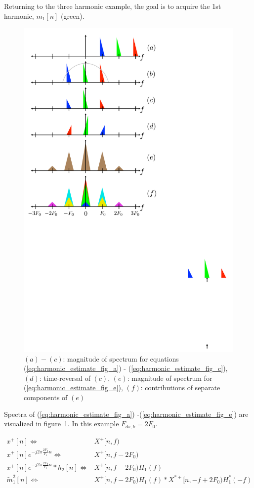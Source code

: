 \documentclass [11pt, proquest,oneside] {ganter_thesis}[2015/03/03]
\begin{document}
Returning to the three harmonic example, the goal is to acquire the 1st harmonic, $m_1[n]$ (green).

\begin{figure}[!ht]
  \centering
    \includegraphics[width=.62\textwidth]{harmonic_envelope_estimate} 
        \caption{$(a)-(c)$: magnitude of spectrum for equations (\ref{eq:harmonic_estimate_fig_a}) - (\ref{eq:harmonic_estimate_fig_c}), $(d)$: time-reversal of $(c)$, $(e)$: magnitude of spectrum for (\ref{eq:harmonic_estimate_fig_e}), $(f)$: contributions of separate components of $(e)$}\label{fig:harmonic_envelope_estimate}
\end{figure}

Spectra of (\ref{eq:harmonic_estimate_fig_a}) -(\ref{eq:harmonic_estimate_fig_e}) are visualized in figure~\ref{fig:harmonic_envelope_estimate}.  In this example $F_{ds,k} = 2F_0$.

\begin{align}
\label{eq:harmonic_estimate_fig_a}
x^+[n] \Longleftrightarrow& X^+[n,f) \\
%
x^+[n]e^{-j2\pi \frac{2F_0}{F_s}n} \Longleftrightarrow& X^+[n,f - 2F_0) \\
%
\label{eq:harmonic_estimate_fig_c}
x^+[n]e^{-j2\pi \frac{2F_0}{F_s}n} * h_2[n] \Longleftrightarrow& X^+[n,f - 2F_0) H_1(f) \\
%
\label{eq:harmonic_estimate_fig_e}
\tilde{m}_1^2[n] \Longleftrightarrow& X^+[n,f - 2F_0) H_1(f) * X^{*+}[n,-f + 2F_0) H_1^*(-f)
\end{align}
\end{document}
